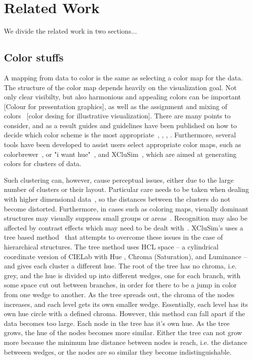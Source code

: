 \documentclass[review,journal]{vgtc}         %
\begin{document}
\section{Related Work}

We divide the related work in two sections...

\subsection{Color stuffs}


A mapping from data to color is the same as selecting a color map for the data. The structure of the color map depends heavily on the visualization goal. Not only clear visibilty, but also harmonious and appealing colors can be important~\cite{ColourpPresentationGraphics2003} [Colour for presentation graphics], as well as the assignment and mixing of colors~\cite{ColorDesignIllustrativeVisualization} [color desing for illustrative visualization]. There are many points to consider, and as a result guides and guidelines have been published on how to decide which color scheme is the most appropriate~\cite{RuleBasedTool}, \cite{ChoosingEffectiveColours}, \cite{SurveyAndTask-based}, \cite{ExplorativeAnalysis}. Furthermore, several tools have been developed to assist users select appropriate color maps, such as colorbrewer~\cite{ColorBrewer}, or "i want hue"~\cite{iwanthue}, and XCluSim~\cite{xclusim}, which are aimed at generating colors for clusters of data. 


Such clustering can, however, cause perceptual issues, either due to the large number of clusters or their layout. 
Particular care needs to be taken when dealing with higher dimensional data~\cite{RevisitingPerceptuallyOptimizedColorMapping}, so the distances between the clusters do not become distorted. 
Furthermore, in cases such as coloring maps, visually dominant structures may visually suppress small groups or areas~\cite{VisibilityOptimization}.
Recognition may also be affected by contrast effects which may need to be dealt with~\cite{CompensatingContrastEffects}.
XCluSim’s uses a tree based method~\cite{treecolors} that attempts to overcome these issues in the case of hierarchical structures. 
The tree method uses HCL space – a cylindrical coordinate version of CIELab with Hue , Chroma (Saturation), and Luminance – and gives each cluster a different hue. 
The root of the tree has no chroma, i.e. grey, and the hue is divided up into different wedges, one for each branch, with some space cut out between branches, in order for there to be a jump in color from one wedge to another. 
As the tree spreads out, the chroma of the nodes increases, and each level gets its own smaller wedge. Essentially, each level has its own hue circle with a defined chroma. However, this method can fall apart if the data becomes too large. Each node in the tree has it's own hue. As the tree grows, the hue of the nodes becomes more similar. Either the tree can not grow more because the minimum hue distance between nodes is reach, i.e. the distance betweeen wedges, or the nodes are so similar they become indistinguishable. 
\end{document}
